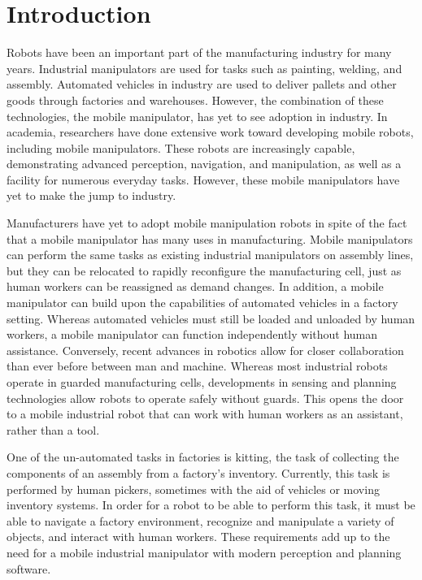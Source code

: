 \documentclass[]{cwru} %
\begin{document}
\mainmatter
\chapter{Introduction}

Robots have been an important part of the manufacturing industry for
many years. Industrial manipulators are used for tasks such as painting,
welding, and assembly. Automated vehicles in industry are used to
deliver pallets and other goods through factories and warehouses.
However, the combination of these technologies, the mobile manipulator,
has yet to see adoption in industry. In academia, researchers have done
extensive work toward developing mobile robots, including mobile
manipulators. These robots are increasingly capable, demonstrating
advanced perception, navigation, and manipulation, as well as a facility
for numerous everyday tasks. However, these mobile manipulators have yet
to make the jump to industry.

Manufacturers have yet to adopt mobile manipulation robots in spite of
the fact that a mobile manipulator has many uses in manufacturing.
Mobile manipulators can perform the same tasks as existing industrial
manipulators on assembly lines, but they can be relocated to rapidly
reconfigure the manufacturing cell, just as human workers can be
reassigned as demand changes. In addition, a mobile manipulator can
build upon the capabilities of automated vehicles in a factory setting.
Whereas automated vehicles must still be loaded and unloaded by human
workers, a mobile manipulator can function independently without human
assistance. Conversely, recent advances in robotics allow for closer
collaboration than ever before between man and machine. Whereas most
industrial robots operate in guarded manufacturing cells, developments
in sensing and planning technologies allow robots to operate safely
without guards. This opens the door to a mobile industrial robot that
can work with human workers as an assistant, rather than a tool.

One of the un-automated tasks in factories is kitting, the task of
collecting the components of an assembly from a factory's inventory.
Currently, this task is performed by human pickers, sometimes with the
aid of vehicles or moving inventory systems. In order for a robot to be
able to perform this task, it must be able to navigate a factory
environment, recognize and manipulate a variety of objects, and interact
with human workers. These requirements add up to the need for a mobile
industrial manipulator with modern perception and planning software.
\end{document}
